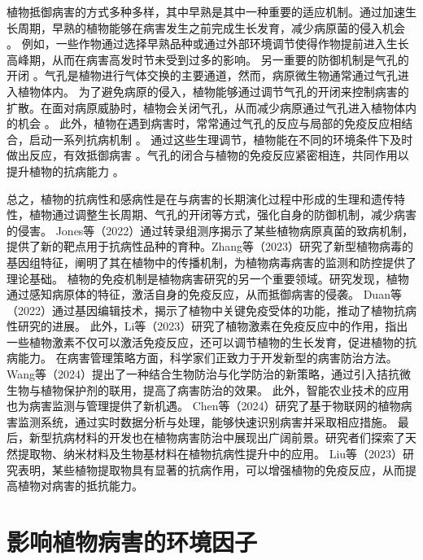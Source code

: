 \documentclass[AutoFakeBold]{LZUThesis-PgD&PhD}
\begin{document}
	植物抵御病害的方式多种多样，其中早熟是其中一种重要的适应机制。通过加速生长周期，早熟的植物能够在病害发生之前完成生长发育，减少病原菌的侵入机会 \cite{liu2020early}。
	例如，一些作物通过选择早熟品种或通过外部环境调节使得作物提前进入生长高峰期，从而在病害高发时节未受到过多的影响。
	另一重要的防御机制是气孔的开闭 \cite{harman2018stomatal}。气孔是植物进行气体交换的主要通道，然而，病原微生物通常通过气孔进入植物体内。
	为了避免病原的侵入，植物能够通过调节气孔的开闭来控制病害的扩散。在面对病原威胁时，植物会关闭气孔，从而减少病原通过气孔进入植物体内的机会 \cite{baker2018plant}。
	此外，植物在遇到病害时，常常通过气孔的反应与局部的免疫反应相结合，启动一系列抗病机制 \cite{zhu2019stomatal}。
	通过这些生理调节，植物能在不同的环境条件下及时做出反应，有效抵御病害 \cite{farago2020immune}。气孔的闭合与植物的免疫反应紧密相连，共同作用以提升植物的抗病能力 \cite{wang2021stomatal}。
	
	总之，植物的抗病性和感病性是在与病害的长期演化过程中形成的生理和遗传特性，植物通过调整生长周期、气孔的开闭等方式，强化自身的防御机制，减少病害的侵害。
	Jones等（2022）通过转录组测序揭示了某些植物病原真菌的致病机制，提供了新的靶点用于抗病性品种的育种\cite{jones2022}。Zhang等（2023）研究了新型植物病毒的基因组特征，阐明了其在植物中的传播机制，为植物病毒病害的监测和防控提供了理论基础\cite{zhang2023genomic}。
	植物的免疫机制是植物病害研究的另一个重要领域。研究发现，植物通过感知病原体的特征，激活自身的免疫反应，从而抵御病害的侵袭。
	Duan等（2022）通过基因编辑技术，揭示了植物中关键免疫受体的功能，推动了植物抗病性研究的进展\cite{duan2022gene}。
	此外，Li等（2023）研究了植物激素在免疫反应中的作用，指出一些植物激素不仅可以激活免疫反应，还可以调节植物的生长发育，促进植物的抗病能力\cite{li2023role}。
	在病害管理策略方面，科学家们正致力于开发新型的病害防治方法。
	Wang等（2024）提出了一种结合生物防治与化学防治的新策略，通过引入拮抗微生物与植物保护剂的联用，提高了病害防治的效果\cite{wang2024novel}。
	此外，智能农业技术的应用也为病害监测与管理提供了新机遇。
	Chen等（2024）研究了基于物联网的植物病害监测系统，通过实时数据分析与处理，能够快速识别病害并采取相应措施\cite{chen2024iot}。
	最后，新型抗病材料的开发也在植物病害防治中展现出广阔前景。研究者们探索了天然提取物、纳米材料及生物基材料在植物抗病性提升中的应用。
	Liu等（2023）研究表明，某些植物提取物具有显著的抗病作用，可以增强植物的免疫反应，从而提高植物对病害的抵抗能力\cite{liu2023natural}。
	
	
	\section{影响植物病害的环境因子}
	
\end{document}
